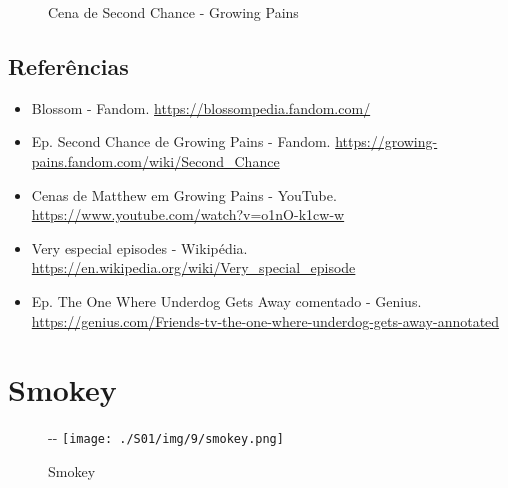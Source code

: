 \begin{figure}
  \centering
    \caption{Cena de Second Chance - Growing Pains\label{fig:cena-de-second-chance-growing-pains}}
\end{figure}

\hypertarget{referuxeancias-3}{%
\subsection{Referências}\label{referuxeancias-3}}

\begin{itemize}
\tightlist
\item
  \sloppy Blossom - Fandom. \url{https://blossompedia.fandom.com/}
\item
  \sloppy Ep. Second Chance de Growing Pains - Fandom. \url{https://growing-pains.fandom.com/wiki/Second_Chance}
\item
  \sloppy Cenas de Matthew em Growing Pains - YouTube. \url{https://www.youtube.com/watch?v=o1nO-k1cw-w}
\item
  \sloppy Very especial episodes - Wikipédia. \url{https://en.wikipedia.org/wiki/Very_special_episode}
\item
  \sloppy Ep. The One Where Underdog Gets Away comentado - Genius. \url{https://genius.com/Friends-tv-the-one-where-underdog-gets-away-annotated}
\end{itemize}

\hypertarget{smokey}{%
\section{Smokey}\label{smokey}}

\begin{figure}[!ht]
  \begin{adjustwidth}{-\oddsidemargin-1in}{-\rightmargin}
    \centering
    \texttt{[image: ./S01/img/9/smokey.png]}
    \caption{Smokey\label{fig:smokey}}
  \end{adjustwidth}
\end{figure}

